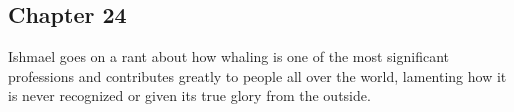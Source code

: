 \subsection{Chapter 24}

Ishmael goes on a rant about how whaling is one of the most significant
professions and contributes greatly to people all over the world, lamenting how
it is never recognized or given its true glory from the outside.

